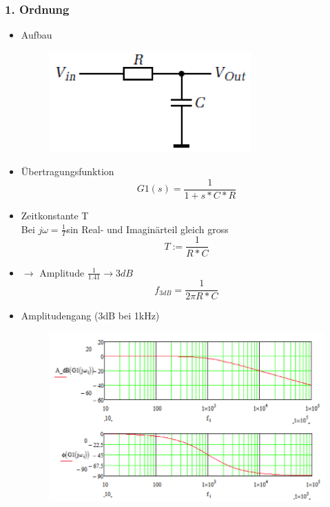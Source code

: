 \subsubsection{1. Ordnung}
\begin{itemize}
  \item Aufbau\\
  \begin{figure}[htb]
  \includegraphics[scale=0.4]{pictures/tiefpass1ordnung}
  \end{figure}
  \item Übertragungsfunktion 
  \begin{equation}
  G1(s)=\frac{1}{1+s*C*R}
  \end{equation}
  \item Zeitkonstante T\\
  Bei $j\omega=\frac{1}{T}$sin Real-  und Imaginärteil gleich gross
  \begin{equation}
  T:=\frac{1}{R*C}
  \end{equation}
  \item $\to$ Amplitude $\frac{1}{1.41}\to 3dB$
  \begin{equation}
  f_{3dB}=\frac{1}{2\pi R*C}
  \end{equation}
  \item Amplitudengang (3dB bei 1kHz)\\
  \begin{figure}[!htbs]
  \includegraphics[scale=0.5]{pictures/tiefpass1ordnungamplitude}
  \end{figure}
  
\end{itemize}
\newpage
